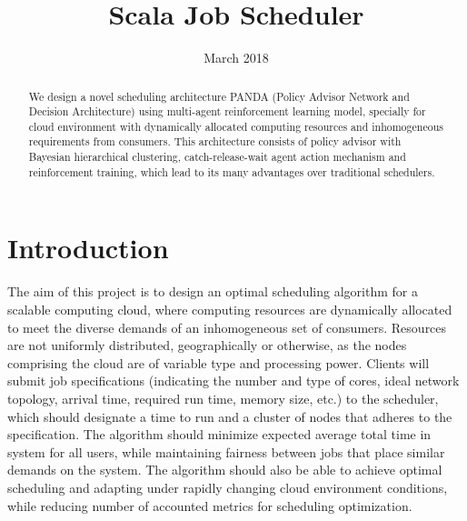 \documentclass{article}
\title{Scala Job Scheduler}
\date{March 2018}
\theoremstyle{definition}
\theoremstyle{remark}
\begin{document}
	
	\maketitle
	
	\begin{abstract}
		We design a novel scheduling architecture PANDA (Policy Advisor Network and Decision Architecture) using
		multi-agent reinforcement learning model, specially for cloud environment with dynamically allocated computing
		resources and inhomogeneous requirements from consumers. This architecture consists of policy advisor with
		Bayesian hierarchical clustering, catch-release-wait agent action mechanism and reinforcement training,
		which lead to its many advantages over traditional schedulers.
	\end{abstract}
	
	\newpage
	\tableofcontents
	
	\newpage
	


	\section*{Introduction}

	\indent
	
	The aim of this project is to design an optimal scheduling algorithm for a scalable computing cloud, where computing resources are dynamically allocated to meet the diverse demands of an inhomogeneous set of consumers. Resources are not uniformly distributed, geographically or otherwise, as the nodes comprising the cloud are of variable type	and processing power. Clients will submit job specifications (indicating the number and type of cores, ideal network topology, arrival time, required run time, memory size, etc.) to the scheduler, which should designate a time to run and a cluster of nodes that adheres to the specification. The algorithm should minimize expected average total time in system for all users, while maintaining fairness between jobs that place similar demands on the system. The algorithm should also be able to achieve	optimal scheduling and adapting under rapidly changing cloud environment conditions, while reducing number of accounted metrics for scheduling optimization.
	
\end{document}
